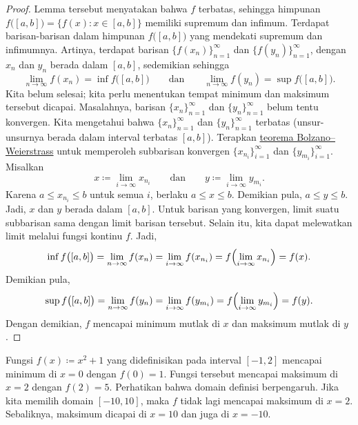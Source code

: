 \begin{proof}
Lemma tersebut menyatakan bahwa $f$ terbatas, sehingga
himpunan $f\bigl([a,b]\bigr) = \bigl\{ f(x) : x \in [a,b] \bigr\}$ memiliki supremum dan infimum.
Terdapat barisan-barisan
dalam himpunan $f\bigl([a,b]\bigr)$ yang mendekati supremum dan infimumnya.
Artinya, terdapat barisan
$\bigl\{ f(x_n) \bigr\}_{n=1}^\infty$ dan $\bigl\{ f(y_n)
\bigr\}_{n=1}^\infty$, dengan $x_n$ dan $y_n$ berada dalam $[a,b]$,
sedemikian sehingga
\begin{equation*}
\lim_{n\to\infty} f(x_n) = \inf f\bigl([a,b]\bigr) \qquad \text{dan} \qquad
\lim_{n\to\infty} f(y_n) = \sup f\bigl([a,b]\bigr).
\end{equation*}
Kita belum selesai; kita perlu menentukan tempat minimum dan maksimum tersebut dicapai.
Masalahnya, barisan $\{ x_n \}_{n=1}^\infty$ dan
$\{ y_n \}_{n=1}^\infty$ belum tentu konvergen.
Kita mengetahui bahwa $\{ x_n \}_{n=1}^\infty$ dan $\{ y_n \}_{n=1}^\infty$ terbatas
(unsur-unsurnya berada dalam interval terbatas $[a,b]$).
Terapkan
\hyperref[thm:bwseq]{teorema Bolzano--Weierstrass}
untuk memperoleh
subbarisan konvergen
$\{ x_{n_i} \}_{i=1}^\infty$ dan
$\{ y_{m_i} \}_{i=1}^\infty$.  Misalkan
\begin{equation*}
x \coloneqq \lim_{i\to\infty} x_{n_i}
\qquad \text{dan} \qquad
y \coloneqq \lim_{i\to\infty} y_{m_i}.
\end{equation*}
Karena $a \leq x_{n_i} \leq b$ untuk semua $i$, berlaku $a \leq x \leq b$.
Demikian pula, $a \leq y \leq b$.  Jadi, $x$ dan $y$ berada dalam $[a,b]$.
Untuk barisan yang konvergen,
limit suatu subbarisan sama dengan limit
barisan tersebut.  Selain itu, kita dapat melewatkan limit melalui fungsi kontinu $f$.  Jadi,
\begin{equation*}
\inf f\bigl([a,b]\bigr) = \lim_{n\to\infty} f(x_n)
= \lim_{i\to\infty} f(x_{n_i}) = 
f \Bigl( \lim_{i\to\infty} x_{n_i} \Bigr) = f(x) .
\end{equation*}
Demikian pula,
\begin{equation*}
\sup f\bigl([a,b]\bigr) = \lim_{n\to\infty} f(y_n)
= \lim_{i\to\infty} f(y_{m_i}) = 
f \Bigl( \lim_{i\to\infty} y_{m_i} \Bigr) = f(y) .
\end{equation*}
Dengan demikian, $f$ mencapai minimum mutlak di $x$ dan
maksimum mutlak di $y$.
\end{proof}

\begin{example}
Fungsi $f(x) \coloneqq x^2+1$ yang didefinisikan pada interval $[-1,2]$ mencapai minimum
di $x=0$ dengan $f(0) = 1$.  Fungsi tersebut mencapai maksimum di $x=2$ dengan $f(2) = 5$.
Perhatikan bahwa domain definisi berpengaruh.  Jika kita memilih domain
$[-10,10]$, maka $f$ tidak lagi mencapai maksimum di $x=2$.
Sebaliknya,
maksimum dicapai di $x=10$ dan juga di $x=-10$.
\end{example}

